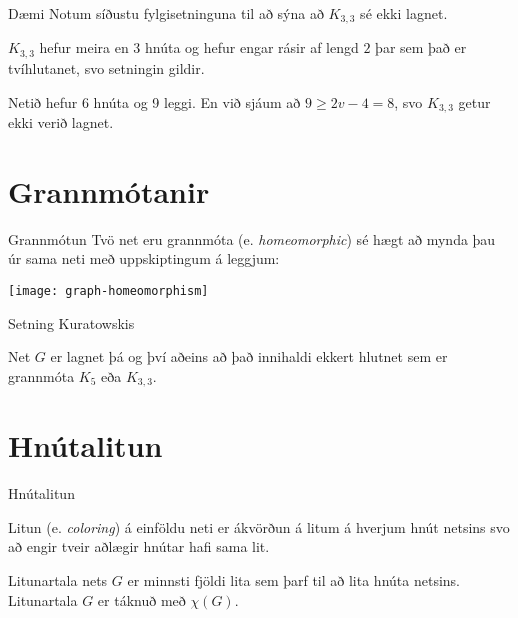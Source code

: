 \documentclass[handout]{beamer}
\begin{document}
\begin{frame}{Dæmi}
Notum síðustu fylgisetninguna til að sýna að $K_{3,3}$ sé ekki lagnet. \pause

\vspace{1cm}
$K_{3,3}$ hefur meira en 3 hnúta og hefur engar rásir af lengd $2$ þar sem það er tvíhlutanet, svo setningin gildir.

Netið hefur 6 hnúta og 9 leggi. En við sjáum að $9 \geq 2v - 4 = 8$, svo $K_{3, 3}$ getur ekki verið lagnet.
\end{frame}

\section{Grannmótanir}

\begin{frame}{Grannmótun}
Tvö net eru grannmóta (e. \emph{homeomorphic}) sé hægt að mynda þau úr sama neti með uppskiptingum á leggjum:
\begin{center}
\texttt{[image: graph-homeomorphism]}
\end{center}
\end{frame}

\begin{frame}{Setning Kuratowskis}
\begin{tcolorbox}[title=Setning Kuratowskis]
Net $G$ er lagnet þá og því aðeins að það innihaldi ekkert hlutnet sem er grannmóta $K_5$ eða $K_{3,3}$.
\end{tcolorbox}

\end{frame}


\section{Hnútalitun}

\begin{frame}{Hnútalitun}
\begin{tcolorbox}[title=Litun]
Litun (e. \emph{coloring}) á einföldu neti er ákvörðun á litum á hverjum hnút netsins svo að engir tveir aðlægir hnútar hafi sama lit.
\end{tcolorbox}

\begin{tcolorbox}[title=Litunartala]
Litunartala nets $G$ er minnsti fjöldi lita sem þarf til að lita hnúta netsins. Litunartala $G$ er táknuð með $\chi(G)$.
\end{tcolorbox}

\end{frame}
\end{document}
